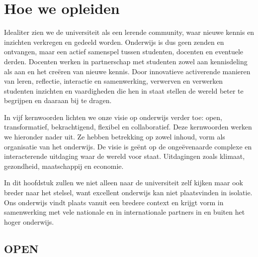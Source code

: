 \documentclass{jote-book}
\begin{document}
	\section{Hoe we opleiden}



	Idealiter zien we de universiteit als een lerende community, waar nieuwe kennis en inzichten verkregen en gedeeld worden. Onderwijs is dus geen zenden en ontvangen, maar een actief samenspel tussen studenten, docenten en eventuele derden. Docenten werken in partnerschap met studenten zowel aan kennisdeling als aan en het creëren van nieuwe kennis. Door innovatieve activerende manieren van leren, reflectie, interactie en samenwerking, verwerven en verwerken studenten inzichten en vaardigheden die hen in staat stellen de wereld beter te begrijpen en daaraan bij te dragen.



	In vijf kernwoorden lichten we onze visie op onderwijs verder toe: open, transformatief, bekrachtigend, flexibel en collaboratief. Deze kernwoorden werken we hieronder nader uit. Ze hebben betrekking op zowel inhoud, vorm als organisatie van het onderwijs. De visie is geënt op de ongeëvenaarde complexe en interacterende uitdaging waar de wereld voor staat. Uitdagingen zoals klimaat, gezondheid, maatschappij en economie.



	In dit hoofdstuk zullen we niet alleen naar de universiteit zelf kijken maar ook breder naar het stelsel, want excellent onderwijs kan niet plaatsvinden in isolatie. Ons onderwijs vindt plaats vanuit een bredere context en krijgt vorm in samenwerking met vele nationale en in internationale partners in en buiten het hoger onderwijs.



	\subsection{OPEN}
\end{document}
